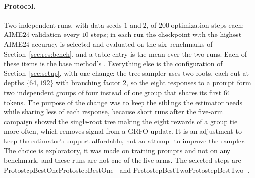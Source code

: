\documentclass[11pt]{article}
\providecommand{\PENDING}{\textcolor{red}{\textbf{--}}}
\newcommand{\num}[1]{\ifcsname #1\endcsname\csname #1\endcsname\else\PENDING\fi}
\begin{document}
\paragraph{Protocol.} Two independent runs, with data seeds $1$ and $2$, of $200$
optimization steps each; AIME24 validation every $10$ steps; in each run the
checkpoint with the highest AIME24 accuracy is selected and evaluated on the six
benchmarks of Section~\ref{sec:res:bench}, and a table entry is the mean over the two
runs. Each of these items is the base method's \citep[App.~E]{steer}. Everything else
is the configuration of Section~\ref{sec:setup}, with one change: the tree sampler
uses two roots, each cut at depths $\{64, 192\}$ with branching factor $2$, so the
eight responses to a prompt form two independent groups of four instead of one group
that shares its first $64$ tokens. The purpose of the change was to keep the
siblings the estimator needs while sharing less of each response, because short runs
after the five-arm campaign showed the single-root tree making the eight rewards of a
group tie more often, which removes signal from a GRPO update. It is an adjustment to
keep the estimator's support affordable, not an attempt to improve the sampler. The
choice is exploratory, it was made on training prompts and not on any benchmark, and
these runs are not one of the five arms. The selected
steps are \num{ProtostepBestOne} and \num{ProtostepBestTwo}.
\end{document}
